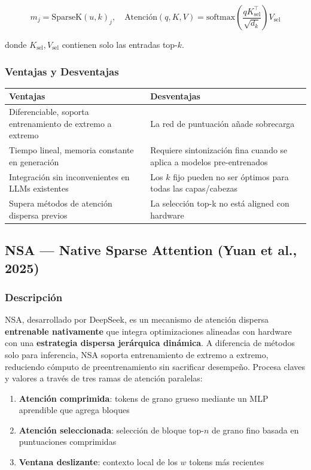 \documentclass[11pt,a4paper]{article}
\begin{document}
$$
m_j = \text{SparseK}(u, k)_j, \quad \text{Atención}(q, K, V) = \text{softmax}\!\left(\frac{qK_{\text{sel}}^\top}{\sqrt{d_k}}\right) V_{\text{sel}}
$$

donde $K_{\text{sel}}, V_{\text{sel}}$ contienen solo las entradas top-$k$.

\subsubsection{Ventajas y Desventajas}

\begin{tabular}{|p{4cm}|p{4cm}|}
\hline
\textbf{Ventajas} & \textbf{Desventajas} \\
\hline
Diferenciable, soporta entrenamiento de extremo a extremo & La red de puntuación añade sobrecarga \\
Tiempo lineal, memoria constante en generación & Requiere sintonización fina cuando se aplica a modelos pre-entrenados \\
Integración sin inconvenientes en LLMs existentes & Los $k$ fijo pueden no ser óptimos para todas las capas/cabezas \\
Supera métodos de atención dispersa previos & La selección top-k no está aligned con hardware \\
\hline
\end{tabular}

\subsection{NSA — Native Sparse Attention (Yuan et al., 2025)}

\subsubsection{Descripción}

NSA, desarrollado por DeepSeek, es un mecanismo de atención dispersa \textbf{entrenable nativamente} que integra optimizaciones alineadas con hardware con una \textbf{estrategia dispersa jerárquica dinámica}. A diferencia de métodos solo para inferencia, NSA soporta entrenamiento de extremo a extremo, reduciendo cómputo de preentrenamiento sin sacrificar desempeño. Procesa claves y valores a través de tres ramas de atención paralelas:

\begin{enumerate}[leftmargin=*]
\item \textbf{Atención comprimida}: tokens de grano grueso mediante un MLP aprendible que agrega bloques
\item \textbf{Atención seleccionada}: selección de bloque top-$n$ de grano fino basada en puntuaciones comprimidas
\item \textbf{Ventana deslizante}: contexto local de los $w$ tokens más recientes
\end{enumerate}
\end{document}
